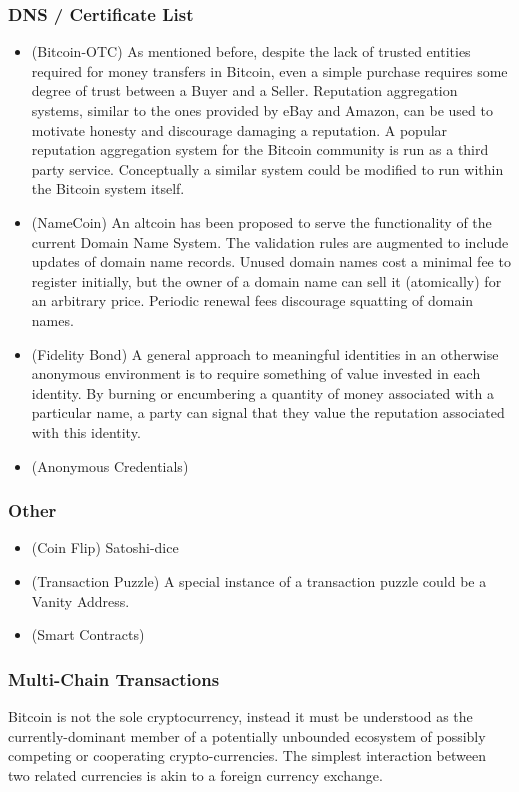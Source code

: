 \subsubsection{DNS / Certificate List}
\begin{itemize}
\item (Bitcoin-OTC) As mentioned before, despite the lack of trusted entities required for money transfers in Bitcoin, even a simple purchase requires some degree of trust between a Buyer and a Seller. Reputation aggregation systems, similar to the ones provided by eBay and Amazon, can be used to motivate honesty and discourage damaging a reputation. A popular reputation aggregation system for the Bitcoin community is run as a third party service. Conceptually a similar system could be modified to run within the Bitcoin system itself.
\item (NameCoin) An altcoin has been proposed to serve the functionality of the current Domain Name System. The validation rules are augmented to include updates of domain name records. Unused domain names cost a minimal fee to register initially, but the owner of a domain name can sell it (atomically) for an arbitrary price. Periodic renewal fees discourage squatting of domain names.
\item (Fidelity Bond) A general approach to meaningful identities in an otherwise anonymous environment is to require something of value invested in each identity. By burning or encumbering a quantity of money associated with a particular name, a party can signal that they value the reputation associated with this identity.
\item (Anonymous Credentials)
\end{itemize}

\subsubsection{Other}

\begin{itemize}
\item (Coin Flip) Satoshi-dice
\item (Transaction Puzzle) A special instance of a transaction puzzle could be a Vanity Address.
\item (Smart Contracts)
\end{itemize}

\subsubsection{Multi-Chain Transactions}
Bitcoin is not the sole cryptocurrency, instead it must be understood as the currently-dominant member of a potentially unbounded ecosystem of possibly competing or cooperating crypto-currencies. The simplest interaction between two related currencies is akin to a foreign currency exchange.

